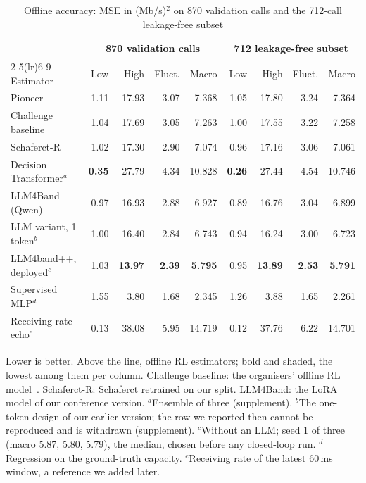 \begin{table}[t]
\centering
\begin{threeparttable}
\caption{Offline accuracy: MSE in \textnormal{(Mb/s)$^2$} on 870 validation calls and the 712-call leakage-free subset}
\label{tab:offline}
\footnotesize
\begin{tabular*}{\textwidth}{@{\extracolsep{\fill}}lrrrrrrrr}
\toprule
& \multicolumn{4}{c}{870 validation calls} & \multicolumn{4}{c}{712 leakage-free subset} \\ \cmidrule(lr){2-5}\cmidrule(lr){6-9}
Estimator & Low & High & Fluct. & Macro & Low & High & Fluct. & Macro \\
\midrule
Pioneer & 1.11 & 17.93 & 3.07 & 7.368 & 1.05 & 17.80 & 3.24 & 7.364 \\
Challenge baseline & 1.04 & 17.69 & 3.05 & 7.263 & 1.00 & 17.55 & 3.22 & 7.258 \\
Schaferct-R & 1.02 & 17.30 & 2.90 & 7.074 & 0.96 & 17.16 & 3.06 & 7.061 \\
Decision Transformer$^{a}$ & \cellcolor{favour}\textbf{0.35} & 27.79 & 4.34 & 10.828 & \cellcolor{favour}\textbf{0.26} & 27.44 & 4.54 & 10.746 \\
LLM4Band (Qwen) & 0.97 & 16.93 & 2.88 & 6.927 & 0.89 & 16.76 & 3.04 & 6.899 \\
LLM variant, 1 token$^{b}$ & 1.00 & 16.40 & 2.84 & 6.743 & 0.94 & 16.24 & 3.00 & 6.723 \\
LLM4band++, deployed$^{c}$ & 1.03 & \cellcolor{favour}\textbf{13.97} & \cellcolor{favour}\textbf{2.39} & \cellcolor{favour}\textbf{5.795} & 0.95 & \cellcolor{favour}\textbf{13.89} & \cellcolor{favour}\textbf{2.53} & \cellcolor{favour}\textbf{5.791} \\
\midrule
Supervised MLP$^{d}$ & 1.55 & 3.80 & 1.68 & 2.345 & 1.26 & 3.88 & 1.65 & 2.261 \\
Receiving-rate echo$^{e}$ & 0.13 & 38.08 & 5.95 & 14.719 & 0.12 & 37.76 & 6.22 & 14.701 \\
\bottomrule
\end{tabular*}
\begin{tablenotes}\footnotesize
Lower is better. Above the line, offline RL estimators; bold and shaded, the lowest among them per column. Challenge baseline: the organisers' offline RL model~\cite{ACM_mmsys}. Schaferct-R: Schaferct retrained on our split. LLM4Band: the LoRA model of our conference version. $^{a}$Ensemble of three (supplement). $^{b}$The one-token design of our earlier version; the row we reported then cannot be reproduced and is withdrawn (supplement). $^{c}$Without an LLM; seed 1 of three (macro 5.87, 5.80, 5.79), the median, chosen before any closed-loop run. $^{d}$Regression on the ground-truth capacity. $^{e}$Receiving rate of the latest 60\,ms window, a reference we added later.
\end{tablenotes}
\end{threeparttable}
\end{table}